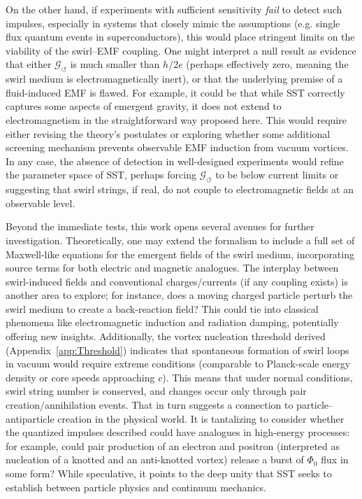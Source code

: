 \documentclass[12pt]{article}
\begin{document}
    On the other hand, if experiments with sufficient sensitivity \emph{fail} to detect such impulses, especially in systems that closely mimic the assumptions (e.g. single flux quantum events in superconductors), this would place stringent limits on the viability of the swirl–EMF coupling. One might interpret a null result as evidence that either $\mathcal{G}_{\!\boldsymbol{\circlearrowleft}}$ is much smaller than $h/2e$ (perhaps effectively zero, meaning the swirl medium is electromagnetically inert), or that the underlying premise of a fluid-induced EMF is flawed. For example, it could be that while SST correctly captures some aspects of emergent gravity, it does not extend to electromagnetism in the straightforward way proposed here. This would require either revising the theory’s postulates or exploring whether some additional screening mechanism prevents observable EMF induction from vacuum vortices. In any case, the absence of detection in well-designed experiments would refine the parameter space of SST, perhaps forcing $\mathcal{G}_{\!\boldsymbol{\circlearrowleft}}$ to be below current limits or suggesting that swirl strings, if real, do not couple to electromagnetic fields at an observable level.

    Beyond the immediate tests, this work opens several avenues for further investigation. Theoretically, one may extend the formalism to include a full set of Maxwell-like equations for the emergent fields of the swirl medium, incorporating source terms for both electric and magnetic analogues. The interplay between swirl-induced fields and conventional charges/currents (if any coupling exists) is another area to explore; for instance, does a moving charged particle perturb the swirl medium to create a back-reaction field? This could tie into classical phenomena like electromagnetic induction and radiation damping, potentially offering new insights. Additionally, the vortex nucleation threshold derived (Appendix~\ref{app:Threshold}) indicates that spontaneous formation of swirl loops in vacuum would require extreme conditions (comparable to Planck-scale energy density or core speeds approaching $c$). This means that under normal conditions, swirl string number is conserved, and changes occur only through pair creation/annihilation events. That in turn suggests a connection to particle--antiparticle creation in the physical world. It is tantalizing to consider whether the quantized impulses described could have analogues in high-energy processes: for example, could pair production of an electron and positron (interpreted as nucleation of a knotted and an anti-knotted vortex) release a burst of $\Phi_{0}$ flux in some form? While speculative, it points to the deep unity that SST seeks to establish between particle physics and continuum mechanics.
\end{document}
